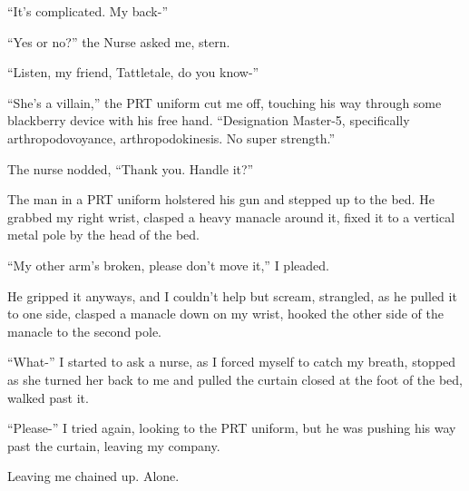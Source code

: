 ``It's complicated. My back-''



``Yes or no?'' the Nurse asked me, stern.



``Listen, my friend, Tattletale, do you know-''



``She's a villain,'' the PRT uniform cut me off, touching his way through some blackberry device with his free hand.  ``Designation Master-5, specifically arthropodovoyance, arthropodokinesis.  No super strength.''



The nurse nodded, ``Thank you.  Handle it?''



The man in a PRT uniform holstered his gun and stepped up to the bed.  He grabbed my right wrist, clasped a heavy manacle around it, fixed it to a vertical metal pole by the head of the bed.



``My other arm's broken, please don't move it,'' I pleaded.



He gripped it anyways, and I couldn't help but scream, strangled, as he pulled it to one side, clasped a manacle down on my wrist, hooked the other side of the manacle to the second pole.



``What-'' I started to ask a nurse, as I forced myself to catch my breath, stopped as she turned her back to me and pulled the curtain closed at the foot of the bed, walked past it.



``Please-'' I tried again, looking to the PRT uniform, but he was pushing his way past the curtain, leaving my company.



Leaving me chained up.  Alone.





